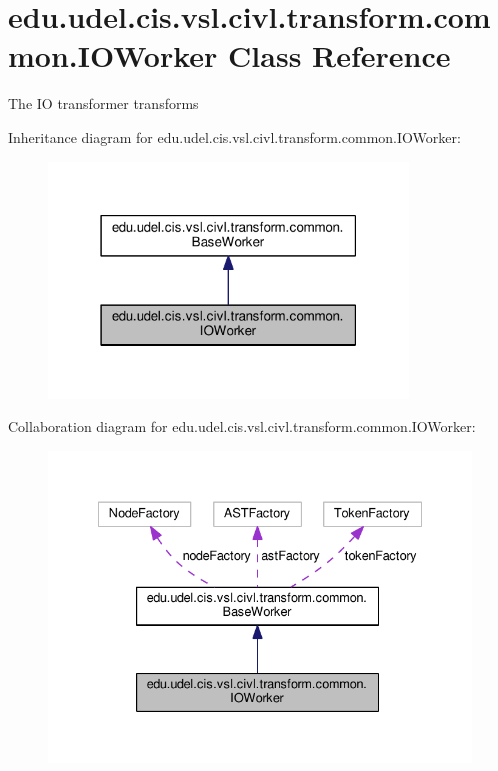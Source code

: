 \hypertarget{classedu_1_1udel_1_1cis_1_1vsl_1_1civl_1_1transform_1_1common_1_1IOWorker}{}\section{edu.\+udel.\+cis.\+vsl.\+civl.\+transform.\+common.\+I\+O\+Worker Class Reference}
\label{classedu_1_1udel_1_1cis_1_1vsl_1_1civl_1_1transform_1_1common_1_1IOWorker}


The I\+O transformer transforms~\newline
  




Inheritance diagram for edu.\+udel.\+cis.\+vsl.\+civl.\+transform.\+common.\+I\+O\+Worker\+:
\nopagebreak
\begin{figure}[H]
\begin{center}
\leavevmode
\includegraphics[width=271pt]{classedu_1_1udel_1_1cis_1_1vsl_1_1civl_1_1transform_1_1common_1_1IOWorker__inherit__graph}
\end{center}
\end{figure}


Collaboration diagram for edu.\+udel.\+cis.\+vsl.\+civl.\+transform.\+common.\+I\+O\+Worker\+:
\nopagebreak
\begin{figure}[H]
\begin{center}
\leavevmode
\includegraphics[width=335pt]{classedu_1_1udel_1_1cis_1_1vsl_1_1civl_1_1transform_1_1common_1_1IOWorker__coll__graph}
\end{center}
\end{figure}
